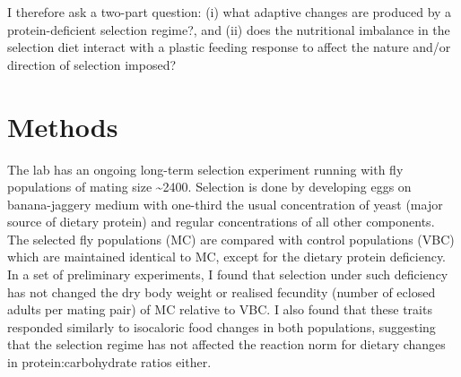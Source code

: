 \documentclass[12pt, onecolumn]{article}
\begin{document}
	I therefore ask a two-part question: (i) what adaptive changes are produced by a protein-deficient selection regime?, and (ii) does the nutritional imbalance in the selection diet interact with a plastic feeding response to affect the nature and/or direction of selection imposed?

    \section*{Methods}
	The lab has an ongoing long-term selection experiment running with fly populations of mating size \textasciitilde 2400. Selection is done by developing eggs on banana-jaggery medium with one-third the usual concentration of yeast (major source of dietary protein) and regular concentrations of all other components. The selected fly populations (MC) are compared with control populations (VBC) which are maintained identical to MC, except for the dietary protein deficiency. In a set of preliminary experiments, I found that selection under such deficiency has not changed the dry body weight or realised fecundity (number of eclosed adults per mating pair) of MC relative to VBC. I also found that these traits responded similarly to isocaloric food changes in both populations, suggesting that the selection regime has not affected the reaction norm for dietary changes in protein:carbohydrate ratios either.
\end{document}
